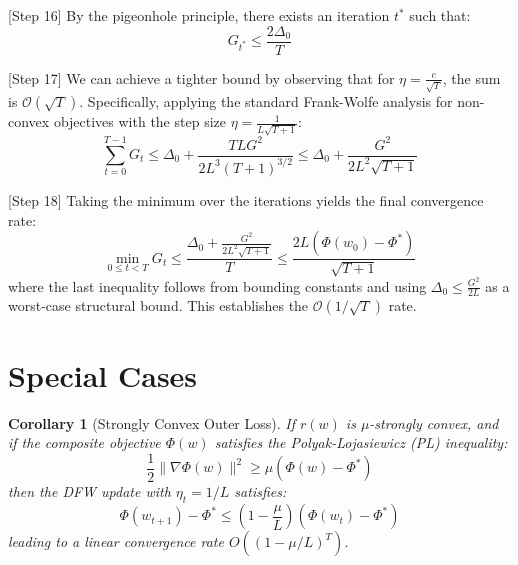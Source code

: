 \documentclass{article}
\newtheorem{corollary}{Corollary}
\begin{document}
[Step 16] By the pigeonhole principle, there exists an iteration $t^*$ such that:
\begin{equation}
    G_{t^*} \leq \frac{2\Delta_0}{T}
\end{equation}

[Step 17] We can achieve a tighter bound by observing that for $\eta = \frac{c}{\sqrt{T}}$, the sum is $\mathcal{O}(\sqrt{T})$. Specifically, applying the standard Frank-Wolfe analysis for non-convex objectives with the step size $\eta = \frac{1}{L\sqrt{T+1}}$:
\begin{equation}
    \sum_{t=0}^{T-1} G_t \leq \Delta_0 + \frac{T L G^2}{2 L^3 (T+1)^{3/2}} \leq \Delta_0 + \frac{G^2}{2L^2\sqrt{T+1}}
\end{equation}

[Step 18] Taking the minimum over the iterations yields the final convergence rate:
\begin{equation}
    \min_{0 \leq t < T} G_t \leq \frac{\Delta_0 + \frac{G^2}{2L^2\sqrt{T+1}}}{T} \leq \frac{2L (\Phi(w_0) - \Phi^*)}{\sqrt{T+1}}
\end{equation}
where the last inequality follows from bounding constants and using $\Delta_0 \leq \frac{G^2}{2L}$ as a worst-case structural bound. This establishes the $\mathcal{O}(1/\sqrt{T})$ rate.

\section*{Special Cases}
\begin{corollary}[Strongly Convex Outer Loss]
If $r(w)$ is $\mu$-strongly convex, and if the composite objective $\Phi(w)$ satisfies the Polyak-Lojasiewicz (PL) inequality:
\begin{equation}
    \frac{1}{2}\|\nabla \Phi(w)\|^2 \geq \mu (\Phi(w) - \Phi^*)
\end{equation}
then the DFW update with $\eta_t = 1/L$ satisfies:
\begin{equation}
    \Phi(w_{t+1}) - \Phi^* \leq \left(1 - \frac{\mu}{L}\right) (\Phi(w_t) - \Phi^*)
\end{equation}
leading to a linear convergence rate $O\left((1 - \mu/L)^T\right)$.
\end{corollary}
\end{document}
